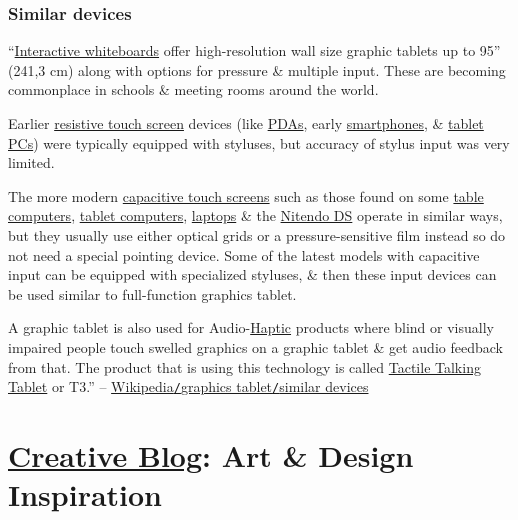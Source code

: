\documentclass[oneside]{book}
\numberwithin{equation}{section}
\begin{document}
\subsection{Similar devices}
``\href{https://en.wikipedia.org/wiki/Interactive_whiteboard}{Interactive whiteboards} offer high-resolution wall size graphic tablets up to 95'' (241,3 cm) along with options for pressure \& multiple input. These are becoming commonplace in schools \& meeting rooms around the world.

Earlier \href{https://en.wikipedia.org/wiki/Resistive_touch_screen}{resistive touch screen} devices (like \href{https://en.wikipedia.org/wiki/Personal_digital_assistant}{PDAs}, early \href{https://en.wikipedia.org/wiki/Smartphone}{smartphones}, \& \href{https://en.wikipedia.org/wiki/Tablet_PC}{tablet PCs}) were typically equipped with styluses, but accuracy of stylus input was very limited.

The more modern \href{https://en.wikipedia.org/wiki/Capacitive_touch_screen}{capacitive touch screens} such as those found on some \href{https://en.wikipedia.org/wiki/Table_computer}{table computers}, \href{https://en.wikipedia.org/wiki/Tablet_computer}{tablet computers}, \href{https://en.wikipedia.org/wiki/Laptop}{laptops} \& the \href{https://en.wikipedia.org/wiki/Nintendo_DS}{Nitendo DS} operate in similar ways, but they usually use either optical grids or a pressure-sensitive film instead so do not need a special pointing device. Some of the latest models with capacitive input can be equipped with specialized styluses, \& then these input devices can be used similar to full-function graphics tablet.

A graphic tablet is also used for Audio-\href{https://en.wikipedia.org/wiki/Haptic_technology}{Haptic} products where blind or visually impaired people touch swelled graphics on a graphic tablet \& get audio feedback from that. The product that is using this technology is called \href{https://en.wikipedia.org/wiki/Tactile_Talking_Tablet}{Tactile Talking Tablet} or T3.'' -- \href{https://en.wikipedia.org/wiki/Graphics_tablet#Similar_devices}{Wikipedia\texttt{/}graphics tablet\texttt{/}similar devices}


\chapter{\href{https://www.creativebloq.com/}{Creative Blog}: Art \& Design Inspiration}
\end{document}

